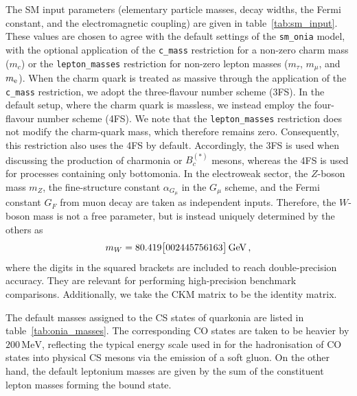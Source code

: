 The SM input parameters (elementary particle masses, decay widths, the Fermi constant, and the electromagnetic coupling) are given in table~\ref{tab:sm_input}. These values are chosen to agree with the default settings of the {\tt sm\_onia} model, with the optional application of the {\tt c\_mass} restriction for a non-zero charm mass ($m_c$) or the {\tt lepton\_masses} restriction for non-zero lepton masses ($m_\tau$, $m_\mu$, and $m_{\mathrm{e}}$).
When the charm quark is treated as massive through the application of the \texttt{c\_mass} restriction, we adopt the three-flavour number scheme (3FS). In the default setup, where the charm quark is massless, we instead employ the four-flavour number scheme (4FS). We note that the \texttt{lepton\_masses} restriction does not modify the charm-quark mass, which therefore remains zero. Consequently, this restriction also uses the 4FS by default. Accordingly, the 3FS is used when discussing the production of charmonia or $B_c^{(*)}$ mesons, whereas the 4FS is used for processes containing only bottomonia.
In the electroweak sector, the $Z$-boson mass $m_Z$, the fine-structure constant $\alpha_{G_\mu}$ in the $G_\mu$ scheme, and the Fermi constant $G_F$ from muon decay are taken as independent inputs. Therefore, the $W$-boson mass is not a free parameter, but is instead uniquely determined by the others as
\begin{equation}
    m_W = 80.419\big[002445756163\big]\,{\rm GeV}\, ,
\end{equation}
where the digits in the squared brackets are included to reach double-precision accuracy. They are relevant for performing high-precision benchmark comparisons.
Additionally, we take the CKM matrix to be the identity matrix.

The default masses assigned to the CS states of quarkonia are listed in table~\ref{tab:onia_masses}. The corresponding CO states are taken to be heavier by $200\,\mathrm{MeV}$, reflecting the typical energy scale used in  for the hadronisation of CO states into physical CS mesons via the emission of a soft gluon.
On the other hand, the default leptonium masses are given by the sum of the constituent lepton masses forming the bound state.

